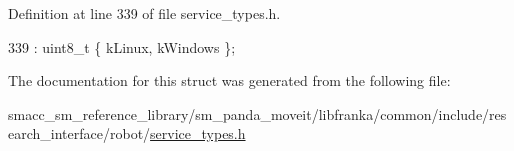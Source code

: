 Definition at line 339 of file service\+\_\+types.\+h.


\begin{DoxyCode}
339 : uint8\_t \{ kLinux, kWindows \};
\end{DoxyCode}


The documentation for this struct was generated from the following file\+:\begin{DoxyCompactItemize}
\item 
smacc\+\_\+sm\+\_\+reference\+\_\+library/sm\+\_\+panda\+\_\+moveit/libfranka/common/include/research\+\_\+interface/robot/\hyperlink{service__types_8h}{service\+\_\+types.\+h}\end{DoxyCompactItemize}
